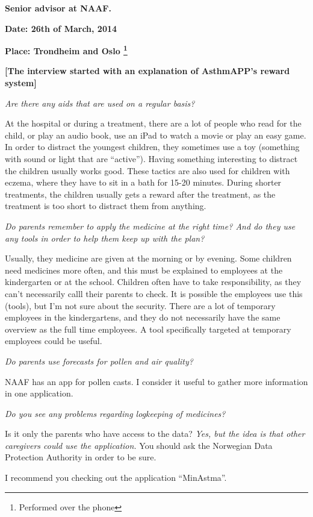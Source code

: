 \textbf{Senior advisor at NAAF.}

\textbf{Date: 26th of March, 2014}

\textbf{Place: Trondheim and Oslo \footnote{Performed over the phone}}

\textbf{[The interview started with an explanation of AsthmAPP's reward system]}

\emph{Are there any aids that are used on a regular basis?}

At the hospital or during a treatment, there are a lot of people who read for the child, or play an audio book, use an iPad to watch a movie or play an easy game. In order to distract the youngest children, they sometimes use a toy (something with sound or light that are ``active''). Having something interesting to distract the children usually works good. These tactics are also used for children with eczema, where they have to sit in a bath for 15-20 minutes.
During shorter treatments, the children usually gets a reward after the treatment, as the treatment is too short to distract them from anything.

\emph{Do parents remember to apply the medicine at the right time? And do they use any tools in order to help them keep up with the plan?}

Usually, they medicine are given at the morning or by evening. Some children need medicines more often, and this must be explained to employees at the kindergarten or at the school. Children often have to take responsibility, as they can't necessarily calll their parents to check. It is possible the employees use this (tools), but I'm not sure about the security. There are a lot of temporary employees in the kindergartens, and they do not necessarily have the same overview as the full time employees. A tool specifically targeted at temporary employees could be useful. 

\emph{Do parents use forecasts for pollen and air quality?}

NAAF has an app for pollen casts. I consider it useful to gather more information in one application. 

\emph{Do you see any problems regarding logkeeping of medicines?}

Is it only the parents who have access to the data?
\emph{Yes, but the idea is that other caregivers could use the application.}
You should ask the Norwegian Data Protection Authority in order to be sure. 

I recommend you checking out the application ``MinAstma''.

